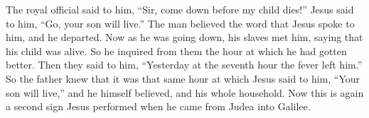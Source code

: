 \begin{biblechapter}
\verse The royal official said to him, “Sir, come down before my child dies!”
\verse Jesus said to him, “Go, your son will live.” The man believed the word that Jesus spoke to him, and he departed.
\verse Now as he was going down, his slaves met him, saying that his child was alive.
\verse So he inquired from them the hour at which he had gotten better. Then they said to him, “Yesterday at the seventh hour the fever left him.”
\verse So the father knew that it was that same hour at which Jesus said to him, “Your son will live,” and he himself believed, and his whole household.
\verse Now this is again a second sign Jesus performed when he came from Judea into Galilee.
\end{biblechapter}

